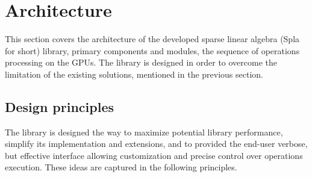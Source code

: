 \section{Architecture}

This section covers the architecture of the developed sparse linear algebra (Spla for short) library, primary components and modules, the sequence of operations processing on the GPUs. The library is designed in order to overcome the limitation of the existing solutions, mentioned in the previous section.

\subsection{Design principles}

The library is designed the way to maximize potential library performance, simplify its implementation and extensions, and to provided the end-user verbose, but effective interface allowing customization and precise control over operations execution. These ideas are captured in the following principles.

